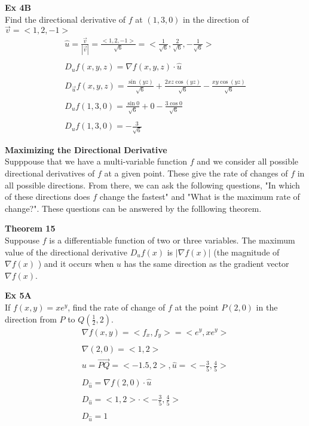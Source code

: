\documentclass{article}
\begin{document}
    \textbf{Ex 4B}\\
    Find the directional derivative of $ f $ at $ (1,3,0) $ in the direction of $ \vec{v}=< 1, 2, -1 >  $
    \[
        \begin{gathered}
        \hat{u}=\frac{\vec{v}}{| \vec{v} |}= \frac{< 1, 2, -1 > }{\sqrt{6}}= < \frac{1}{\sqrt{6} } , \frac{2}{\sqrt{6} } , -\frac{1}{\sqrt{6} }  >  \\
        ~\\
        D_{u}f(x,y,z)= \nabla f(x,y,z) \cdot \hat{u}\\
        ~\\
        D_{\vec{u}}f(x,y,z) = \frac{\sin{(yz)}}{\sqrt{6} } + \frac{2xz\cos{(yz)}}{\sqrt{6} }-\frac{xy\cos{(yz)}}{\sqrt{6}}\\
        ~\\
        D_{u}f(1,3,0) = \frac{\sin{0}}{\sqrt{6} }+ 0 - \frac{3\cos{0}}{\sqrt{6}}\\
        ~\\
        \boxed{D_{u}f(1,3,0) =  -\frac{3}{\sqrt{6}}} 
        \end{gathered}
    \]

    \textbf{Maximizing the Directional Derivative}\\
    Supppouse that we have a multi-variable function $ f $ and we consider all possible directional derivatives of $ f $ at a given point. These give the rate of changes of $ f $ in all possible directions. From there, we can ask the following questions, "In which of these directions does $ f $ change the fastest" and "What is the maximum rate of change?". These questions can be answered by the folllowing theorem.

    \textbf{Theorem 15}\\
    Suppouse $ f $ is a differentiable function of two or three variables. The maximum value of the directional derivative $ D_{u}f(x)$ is $ |\nabla f(x) | $ (the magnitude of $ \nabla f(x) $ ) and it occurs when $ u $ has the same direction as the gradient vector $ \nabla f(x) $.

    \textbf{Ex 5A}\\
    If $ f(x,y) =xe^{y} $, find the rate of change of $ f $ at the point $ P(2,0) $ in the direction from $ P $ to $ Q(\frac{1}{2} ,2) $.
    \[
        \begin{gathered}
        \nabla f(x,y)=< f_{x} , f_{y} >=< e^{y} , xe^{y}  > \\
        ~\\
        \nabla (2,0)=< 1, 2 > \\
        u=\vec{PQ}=< -1.5, 2 >, \hat{u}=< -\frac{3}{5} ,\frac{4}{5}>\\
        ~\\
        D_{\hat{u}}=\nabla f(2,0) \cdot \hat{u}\\
        ~\\
        D_{\hat{u}} = < 1, 2 > \cdot < -\frac{3}{5} , \frac{4}{5}  > \\
        ~\\
      \boxed{D_{\hat{u}}=1}  
        \end{gathered}
    \]
\end{document}
